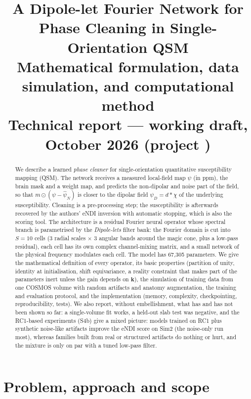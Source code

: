 \documentclass[11pt]{article}
\title{\textbf{A Dipole-let Fourier Network for Phase Cleaning in Single-Orientation QSM}\\[2pt]
\large Mathematical formulation, data simulation, and computational method\\[2pt]
\normalsize Technical report --- working draft, October 2026 (project \code{MCNO-QSM})}
\author{}
\date{}
\newcommand{\bk}{\bm{k}}
\theoremstyle{remark}
\begin{document}
\maketitle

\begin{abstract}
\noindent
We describe a learned \emph{phase cleaner} for single-orientation quantitative susceptibility mapping (QSM). The network
receives a measured local-field map $\psi$ (in ppm), the brain mask and a weight map, and predicts the non-dipolar and noise part of the
field, so that $m\odot(\psi-\widehat{\psi}_N)$ is closer to the dipolar field $\psi_D=d*\chi$ of the underlying susceptibility.
Cleaning is a pre-processing step; the susceptibility is afterwards recovered by the authors' eNDI inversion with automatic stopping, which is
also the scoring tool. The architecture is a residual Fourier neural operator whose spectral branch is parametrised by the
\emph{Dipole-lets} filter bank: the Fourier domain is cut into $S=10$ cells (3 radial scales $\times$ 3 angular bands around the magic cone, plus
a low-pass residual), each cell has its own complex channel-mixing matrix, and a small network of the physical frequency modulates each cell.
The model has 67{,}305 parameters.
We give the mathematical definition of every operator, its basic properties (partition of unity, identity at initialisation, shift
equivariance, a reality constraint that makes part of the parameters inert unless the gain depends on $\bk$), the simulation of training data from one
COSMOS volume with random artifacts and anatomy augmentation, the training and evaluation protocol, and the implementation (memory, complexity,
checkpointing, reproducibility, tests).
We also report, without embellishment, what has and has not been shown so far: a single-volume fit works, a held-out slab test was negative, and the
RC1-based experiments (S4b) give a mixed picture: models trained on RC1 plus synthetic noise-like artifacts improve the eNDI score on Sim2 (the noise-only run most), whereas
families built from real or structured artifacts do nothing or hurt, and the mixture is only on par with a tuned low-pass filter.
\end{abstract}

\tableofcontents
\newpage

\section{Problem, approach and scope}\label{sec:intro}
\end{document}
